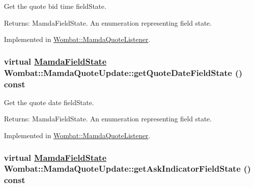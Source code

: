 Get the quote bid time field\-State. 

\begin{Desc}
\item[Returns:]Mamda\-Field\-State. An enumeration representing field state. \end{Desc}


Implemented in \hyperlink{classWombat_1_1MamdaQuoteListener_a8d10456d404dc1ed3fe7231e89a62b3}{Wombat::Mamda\-Quote\-Listener}.\hypertarget{classWombat_1_1MamdaQuoteUpdate_80968cec3430425c8c8f4cb449e36a64}{
\subsubsection[getQuoteDateFieldState]{\setlength{\rightskip}{0pt plus 5cm}virtual \hyperlink{namespaceWombat_93aac974f2ab713554fd12a1fa3b7d2a}{Mamda\-Field\-State} Wombat::Mamda\-Quote\-Update::get\-Quote\-Date\-Field\-State () const}}
\label{classWombat_1_1MamdaQuoteUpdate_80968cec3430425c8c8f4cb449e36a64}


Get the quote date field\-State. 

\begin{Desc}
\item[Returns:]Mamda\-Field\-State. An enumeration representing field state. \end{Desc}


Implemented in \hyperlink{classWombat_1_1MamdaQuoteListener_bbf7249c368d73feb54836bb02a7269a}{Wombat::Mamda\-Quote\-Listener}.\hypertarget{classWombat_1_1MamdaQuoteUpdate_f53101b414b70eff88d9fd62887a93eb}{
\subsubsection[getAskIndicatorFieldState]{\setlength{\rightskip}{0pt plus 5cm}virtual \hyperlink{namespaceWombat_93aac974f2ab713554fd12a1fa3b7d2a}{Mamda\-Field\-State} Wombat::Mamda\-Quote\-Update::get\-Ask\-Indicator\-Field\-State () const}}
\label{classWombat_1_1MamdaQuoteUpdate_f53101b414b70eff88d9fd62887a93eb}



